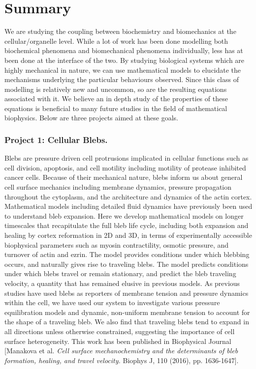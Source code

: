 \chapter{Summary}

We are studying the coupling between biochemistry and biomechanics at the cellular/organelle level. While a lot of work has been done modelling both biochemical phenomena and biomechanical phenomena individually, less has at been done at the interface of the two. By studying biological systems which are highly mechanical in nature, we can use mathematical models to elucidate the mechanisms underlying the particular behaviours observed. Since this class of modelling is relatively new and uncommon, so are the resulting equations associated with it. We believe an in depth study of the properties of these equations is beneficial to many future  studies in the field of mathematical biophysics. Below are three projects aimed at these goals. 

\subsection*{Project 1: Cellular Blebs.}
Blebs are pressure driven cell protrusions implicated in cellular functions such as cell division, apoptosis, and cell motility including motility of protease inhibited cancer cells. Because of their mechanical nature, blebs inform us about general cell surface mechanics including membrane dynamics, pressure propagation throughout the cytoplasm, and the architecture and dynamics of the actin cortex. Mathematical models including detailed fluid dynamics have previously been used to understand bleb expansion. Here we develop mathematical models on longer timescales that recapitulate the full bleb life cycle, including both expansion and healing by cortex reformation in 2D and 3D, in terms of experimentally accessible biophysical parameters such as myosin contractility, osmotic pressure, and turnover of actin and ezrin. The model provides conditions under which blebbing occurs, and naturally gives rise to traveling blebs. The model predicts conditions under which blebs travel or remain stationary, and predict the bleb traveling velocity, a quantity that has remained elusive in previous models.  As previous studies have used blebs as reporters of membrane tension and pressure dynamics within the cell, we have used our system to investigate various pressure equilibration models and dynamic, non-uniform membrane tension to account for the shape of a traveling bleb. We also find that traveling blebs tend to expand in all directions unless otherwise constrained, suggesting the importance of cell surface heterogeneity. This work has been published in Biophysical Journal [Manakova et al. \textit{Cell surface mechanochemistry and the determinants of bleb formation, healing, and travel velocity.} Biophys J, 110 (2016), pp. 1636-1647].


